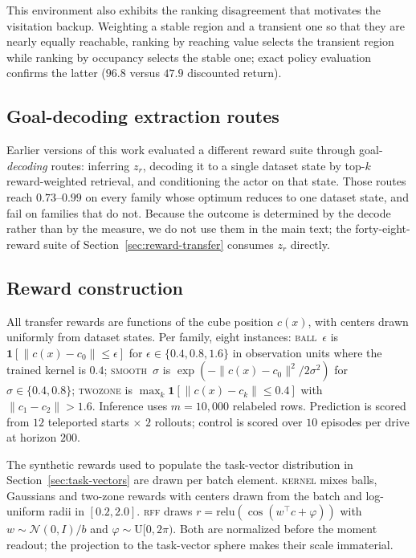 \documentclass{article}
\newcommand{\ind}[1]{\mathbf{1}\!\left[#1\right]}
\newcommand{\cube}{c}
\begin{document}
This environment also exhibits the ranking disagreement that motivates the
visitation backup. Weighting a stable region and a transient one so that they are
nearly equally reachable, ranking by reaching value selects the transient region
while ranking by occupancy selects the stable one; exact policy evaluation
confirms the latter ($96.8$ versus $47.9$ discounted return).

\subsection{Goal-decoding extraction routes}
\label{app:decode}

Earlier versions of this work evaluated a different reward suite through
goal-\emph{decoding} routes: inferring $z_r$, decoding it to a single dataset
state by top-$k$ reward-weighted retrieval, and conditioning the actor on that
state. Those routes reach $0.73$--$0.99$ on every family whose optimum reduces to
one dataset state, and fail on families that do not. Because the outcome is
determined by the decode rather than by the measure, we do not use them in the
main text; the forty-eight-reward suite of Section~\ref{sec:reward-transfer}
consumes $z_r$ directly.

\subsection{Reward construction}
\label{app:rewards}

All transfer rewards are functions of the cube position $\cube(x)$, with centers
drawn uniformly from dataset states. Per family, eight instances:
\textsc{ball}~$\epsilon$ is $\ind{\|\cube(x)-c_0\|\le\epsilon}$ for
$\epsilon\in\{0.4,0.8,1.6\}$ in observation units where the trained kernel is
$0.4$; \textsc{smooth}~$\sigma$ is $\exp(-\|\cube(x)-c_0\|^2/2\sigma^2)$ for
$\sigma\in\{0.4,0.8\}$; \textsc{twozone} is
$\max_k\ind{\|\cube(x)-c_k\|\le0.4}$ with $\|c_1-c_2\|>1.6$. Inference uses
$m=10{,}000$ relabeled rows. Prediction is scored from $12$ teleported starts
$\times$ $2$ rollouts; control is scored over $10$ episodes per drive at horizon
$200$.

The synthetic rewards used to populate the task-vector distribution in
Section~\ref{sec:task-vectors} are drawn per batch element. \textsc{kernel} mixes
balls, Gaussians and two-zone rewards with centers drawn from the batch and
log-uniform radii in $[0.2,2.0]$. \textsc{rff} draws
$r=\mathrm{relu}(\cos(w^{\top}\cube+\varphi))$ with $w\sim\mathcal{N}(0,I)/b$ and
$\varphi\sim\mathrm{U}[0,2\pi)$. Both are normalized before the moment readout;
the projection to the task-vector sphere makes their scale immaterial.
\end{document}
